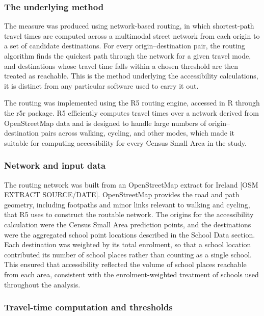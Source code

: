 \documentclass{article}
\begin{document}
\subsubsection{The underlying method}\label{the-underlying-method}

The measure was produced using network-based routing, in which
shortest-path travel times are computed across a multimodal street
network from each origin to a set of candidate destinations. For every
origin--destination pair, the routing algorithm finds the quickest path
through the network for a given travel mode, and destinations whose
travel time falls within a chosen threshold are then treated as
reachable. This is the method underlying the accessibility calculations,
it is distinct from any particular software used to carry it out.

The routing was implemented using the R5 routing engine, accessed in R
through the r5r package. R5 efficiently computes travel times over a
network derived from OpenStreetMap data and is designed to handle large
numbers of origin--destination pairs across walking, cycling, and other
modes, which made it suitable for computing accessibility for every
Census Small Area in the study.

\subsubsection{Network and input data}\label{network-and-input-data}

The routing network was built from an OpenStreetMap extract for Ireland
{[}OSM EXTRACT SOURCE/DATE{]}. OpenStreetMap provides the road and path
geometry, including footpaths and minor links relevant to walking and
cycling, that R5 uses to construct the routable network. The origins for
the accessibility calculation were the Census Small Area prediction
points, and the destinations were the aggregated school point locations
described in the School Data section. Each destination was weighted by
its total enrolment, so that a school location contributed its number of
school places rather than counting as a single school. This ensured that
accessibility reflected the volume of school places reachable from each
area, consistent with the enrolment-weighted treatment of schools used
throughout the analysis.

\subsubsection{Travel-time computation and
thresholds}\label{travel-time-computation-and-thresholds}
\end{document}
